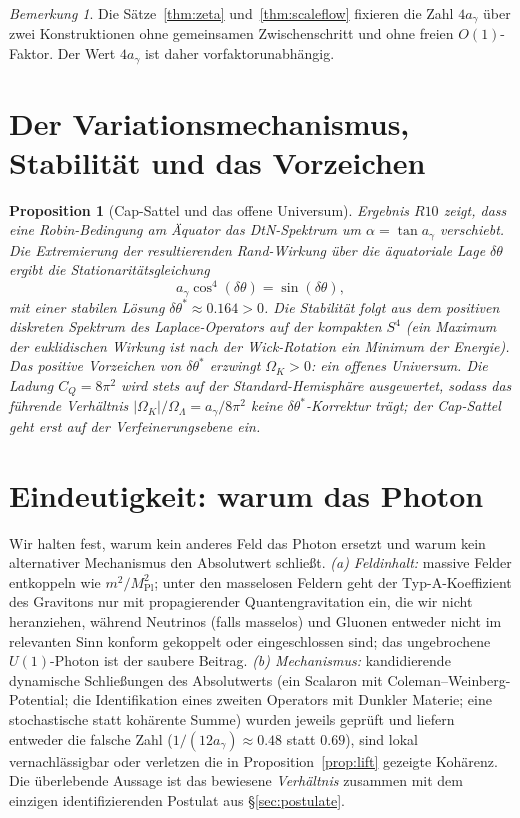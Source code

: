 \documentclass[11pt,a4paper]{article}
\newtheorem{proposition}{Proposition}
\theoremstyle{definition}
\theoremstyle{remark}
\newtheorem{remark}{Bemerkung}
\newcommand{\ag}{a_\gamma}
\newcommand{\CQ}{C_Q}
\newcommand{\Ok}{\Omega_K}
\newcommand{\OL}{\Omega_\Lambda}
\newcommand{\Mpl}{M_{\mathrm{Pl}}}
\begin{document}
\begin{remark}
Die Sätze~\ref{thm:zeta} und~\ref{thm:scaleflow} fixieren die Zahl $4\ag$ über zwei Konstruktionen
ohne gemeinsamen Zwischenschritt und ohne freien $O(1)$-Faktor. Der Wert $4\ag$ ist daher
vorfaktorunabhängig.
\end{remark}

\section{Der Variationsmechanismus, Stabilität und das Vorzeichen}\label{sec:cap}
\begin{proposition}[Cap-Sattel und das offene Universum]\label{prop:sign}
Ergebnis $R10$ zeigt, dass eine Robin-Bedingung am Äquator das DtN-Spektrum um $\alpha=\tan\ag$
verschiebt. Die Extremierung der resultierenden Rand-Wirkung über die äquatoriale Lage
$\delta\theta$ ergibt die Stationaritätsgleichung
\[
\ag\cos^4(\delta\theta)=\sin(\delta\theta),
\]
mit einer stabilen Lösung $\delta\theta^*\approx0.164>0$. Die Stabilität folgt aus dem positiven
diskreten Spektrum des Laplace-Operators auf der kompakten $S^4$ (ein Maximum der euklidischen
Wirkung ist nach der Wick-Rotation ein Minimum der Energie). Das positive Vorzeichen von
$\delta\theta^*$ erzwingt $\Ok>0$: ein \emph{offenes} Universum. Die Ladung $\CQ=8\pi^2$ wird stets
auf der Standard-Hemisphäre ausgewertet, sodass das führende Verhältnis
$\lvert\Ok\rvert/\OL=\ag/8\pi^2$ keine $\delta\theta^*$-Korrektur trägt; der Cap-Sattel geht erst auf
der Verfeinerungsebene ein.
\end{proposition}

\section{Eindeutigkeit: warum das Photon}\label{sec:uniq}
Wir halten fest, warum kein anderes Feld das Photon ersetzt und warum kein alternativer Mechanismus
den Absolutwert schließt. \emph{(a) Feldinhalt:} massive Felder entkoppeln wie $m^2/\Mpl^2$; unter
den masselosen Feldern geht der Typ-A-Koeffizient des Gravitons nur mit propagierender Quantengravitation
ein, die wir nicht heranziehen, während Neutrinos (falls masselos) und Gluonen entweder nicht im
relevanten Sinn konform gekoppelt oder eingeschlossen sind; das ungebrochene $U(1)$-Photon ist der
saubere Beitrag. \emph{(b) Mechanismus:} kandidierende dynamische Schließungen des Absolutwerts (ein
Scalaron mit Coleman--Weinberg-Potential; die Identifikation eines zweiten Operators mit Dunkler
Materie; eine stochastische statt kohärente Summe) wurden jeweils geprüft und liefern entweder die
falsche Zahl ($1/(12\ag)\approx0.48$ statt $0.69$), sind lokal vernachlässigbar oder verletzen die in
Proposition~\ref{prop:lift} gezeigte Kohärenz. Die überlebende Aussage ist das bewiesene
\emph{Verhältnis} zusammen mit dem einzigen identifizierenden Postulat aus \S\ref{sec:postulate}.
\end{document}
